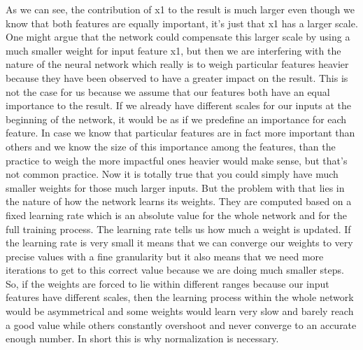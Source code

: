 \documentclass[a4paper,12pt]{report}
\begin{document}
As we can see, the contribution of x1 to the result is much larger even though we know that both features are equally important, it’s just that x1 has a larger scale. One might argue that the network could compensate this larger scale by using a much smaller weight for input feature x1, but then we are interfering with the nature of the neural network which really is to weigh particular features heavier because they have been observed to have a greater impact on the result. This is not the case for us because we assume that our features both have an equal importance to the result. If we already have different scales for our inputs at the beginning of the network, it would be as if we predefine an importance for each feature. In case we know that particular features are in fact more important than others and we know the size of this importance among the features, than the practice to weigh the more impactful ones heavier would make sense, but that’s not common practice. Now it is totally true that you could simply have much smaller weights for those much larger inputs. But the problem with that lies in the nature of how the network learns its weights. They are computed based on a fixed learning rate which is an absolute value for the whole network and for the full training process. The learning rate tells us how much a weight is updated. If the learning rate is very small it means that we can converge our weights to very precise values with a fine granularity but it also means that we need more iterations to get to this correct value because we are doing much smaller steps. So, if the weights are forced to lie within different ranges because our input features have different scales, then the learning process within the whole network would be asymmetrical and some weights would learn very slow and barely reach a good value while others constantly overshoot and never converge to an accurate enough number. In short this is why normalization is necessary. \\
\end{document}

